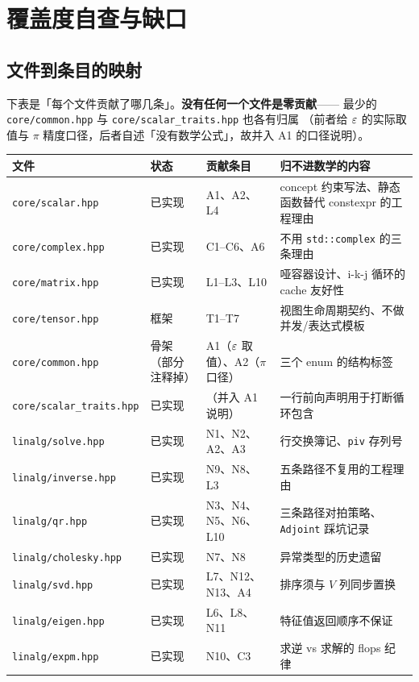 \section{覆盖度自查与缺口}\label{sec:audit}

\subsection{文件到条目的映射}

下表是「每个文件贡献了哪几条」。\textbf{没有任何一个文件是零贡献}——
最少的 \texttt{core/common.hpp} 与 \texttt{core/scalar\_traits.hpp} 也各有归属
（前者给 $\varepsilon$ 的实际取值与 $\pi$ 精度口径，后者自述「没有数学公式」，故并入 A1 的口径说明）。

\begin{longtable}{L{4.8cm}L{1.2cm}L{2.7cm}L{5.2cm}}
\toprule
文件 & 状态 & 贡献条目 & 归不进数学的内容 \\
\midrule
\endhead
\texttt{core/scalar.hpp} & 已实现 & A1、A2、L4 & concept 约束写法、静态函数替代 constexpr 的工程理由 \\
\texttt{core/complex.hpp} & 已实现 & C1--C6、A6 & 不用 \texttt{std::complex} 的三条理由 \\
\texttt{core/matrix.hpp} & 已实现 & L1--L3、L10 & 哑容器设计、i-k-j 循环的 cache 友好性 \\
\texttt{core/tensor.hpp} & 框架 & T1--T7 & 视图生命周期契约、不做并发/表达式模板 \\
\texttt{core/common.hpp} & 骨架（部分注释掉） & A1（$\varepsilon$ 取值）、A2（$\pi$ 口径） & 三个 enum 的结构标签 \\
\texttt{core/scalar\_traits.hpp} & 已实现 & （并入 A1 说明） & 一行前向声明用于打断循环包含 \\
\texttt{linalg/solve.hpp} & 已实现 & N1、N2、A2、A3 & 行交换簿记、\texttt{piv} 存列号 \\
\texttt{linalg/inverse.hpp} & 已实现 & N9、N8、L3 & 五条路径不复用的工程理由 \\
\texttt{linalg/qr.hpp} & 已实现 & N3、N4、N5、N6、L10 & 三条路径对拍策略、\texttt{Adjoint} 踩坑记录 \\
\texttt{linalg/cholesky.hpp} & 已实现 & N7、N8 & 异常类型的历史遗留 \\
\texttt{linalg/svd.hpp} & 已实现 & L7、N12、N13、A4 & 排序须与 $V$ 列同步置换 \\
\texttt{linalg/eigen.hpp} & 已实现 & L6、L8、N11 & 特征值返回顺序不保证 \\
\texttt{linalg/expm.hpp} & 已实现 & N10、C3 & 求逆 vs 求解的 flops 纪律 \\

\end{longtable}
